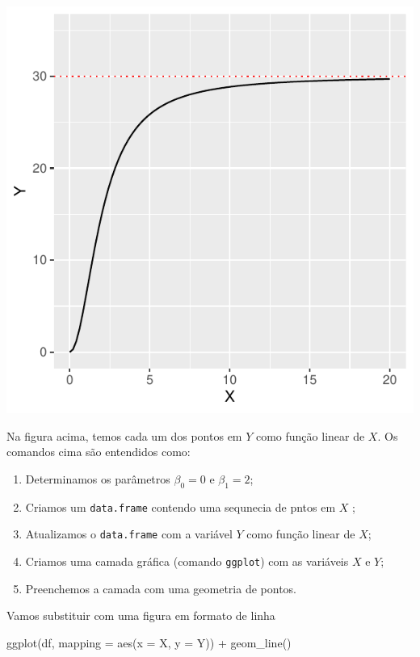 \documentclass[
]{book}
\newenvironment{Shaded}{\begin{snugshade}}{\end{snugshade}}
\newcommand{\AttributeTok}[1]{\textcolor[rgb]{0.77,0.63,0.00}{#1}}
\newcommand{\FunctionTok}[1]{\textcolor[rgb]{0.00,0.00,0.00}{#1}}
\newcommand{\NormalTok}[1]{#1}
\newcommand{\SpecialCharTok}[1]{\textcolor[rgb]{0.00,0.00,0.00}{#1}}
\begin{document}
\begin{center}\includegraphics{probest-cambientais_files/figure-latex/unnamed-chunk-218-1} \end{center}

Na figura acima, temos cada um dos pontos em \(Y\) como função linear de \(X\). Os comandos cima são entendidos como:

\begin{enumerate}
\def\labelenumi{\arabic{enumi}.}
\item
  Determinamos os parâmetros \(\beta_0 = 0\) e \(\beta_1 = 2\);
\item
  Criamos um \texttt{data.frame} contendo uma sequnecia de pntos em \(X\) ;
\item
  Atualizamos o \texttt{data.frame} com a variável \(Y\) como função linear de \(X\);
\item
  Criamos uma camada gráfica (comando \texttt{ggplot}) com as variáveis \(X\) e \(Y\);
\item
  Preenchemos a camada com uma geometria de pontos.
\end{enumerate}

Vamos substituir com uma figura em formato de linha

\begin{Shaded}
\begin{Highlighting}[]
\FunctionTok{ggplot}\NormalTok{(df, }\AttributeTok{mapping =} \FunctionTok{aes}\NormalTok{(}\AttributeTok{x =}\NormalTok{ X, }\AttributeTok{y =}\NormalTok{ Y)) }\SpecialCharTok{+}
  \FunctionTok{geom\_line}\NormalTok{()}
\end{Highlighting}
\end{Shaded}
\end{document}
